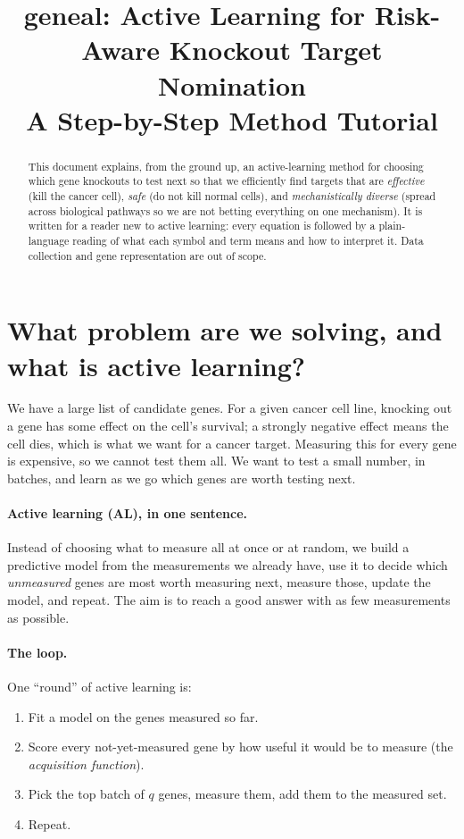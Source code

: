 \documentclass[11pt]{article}
\title{\textbf{geneal}: Active Learning for Risk-Aware Knockout Target Nomination\\
\large A Step-by-Step Method Tutorial}
\author{}
\date{}
\begin{document}
\maketitle

\begin{abstract}
This document explains, from the ground up, an active-learning method for choosing
which gene knockouts to test next so that we efficiently find targets that are
\emph{effective} (kill the cancer cell), \emph{safe} (do not kill normal cells), and
\emph{mechanistically diverse} (spread across biological pathways so we are not betting
everything on one mechanism). It is written for a reader new to active learning: every
equation is followed by a plain-language reading of what each symbol and term means and
how to interpret it. Data collection and gene representation are out of scope.
\end{abstract}

\tableofcontents

\section{What problem are we solving, and what is active learning?}

We have a large list of candidate genes. For a given cancer cell line, knocking out a
gene has some effect on the cell's survival; a strongly negative effect means the cell
dies, which is what we want for a cancer target. Measuring this for every gene is
expensive, so we cannot test them all. We want to test a small number, in batches, and
learn as we go which genes are worth testing next.

\paragraph{Active learning (AL), in one sentence.} Instead of choosing what to measure
all at once or at random, we build a predictive model from the measurements we already
have, use it to decide which \emph{unmeasured} genes are most worth measuring next,
measure those, update the model, and repeat. The aim is to reach a good answer with as
few measurements as possible.

\paragraph{The loop.} One ``round'' of active learning is:
\begin{enumerate}[leftmargin=2em,itemsep=1pt]
\item Fit a model on the genes measured so far.
\item Score every not-yet-measured gene by how useful it would be to measure (the
\emph{acquisition function}).
\item Pick the top batch of $q$ genes, measure them, add them to the measured set.
\item Repeat.
\end{enumerate}
\end{document}
